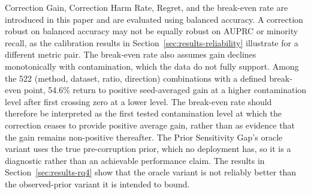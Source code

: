 Correction Gain, Correction Harm Rate, Regret, and the break-even rate are
introduced in this paper and are evaluated using balanced accuracy. A correction
robust on balanced accuracy may not be equally robust on AUPRC or minority
recall, as the calibration results in Section~\ref{sec:results-reliability}
illustrate for a different metric pair. The break-even rate also assumes gain
declines monotonically with contamination, which the data do not fully support.
Among the 522 (method, dataset, ratio, direction) combinations with a defined
break-even point, 54.6\% return to positive seed-averaged gain at a higher
contamination level after first crossing zero at a lower level. The break-even
rate should therefore be interpreted as the first tested contamination level at
which the correction ceases to provide positive average gain, rather than as
evidence that the gain remains non-positive thereafter. The Prior Sensitivity
Gap's oracle variant uses the true pre-corruption prior, which no deployment
has, so it is a diagnostic rather than an achievable performance claim. The
results in Section~\ref{sec:results-rq4} show that the oracle variant is not
reliably better than the observed-prior variant it is intended to bound.
